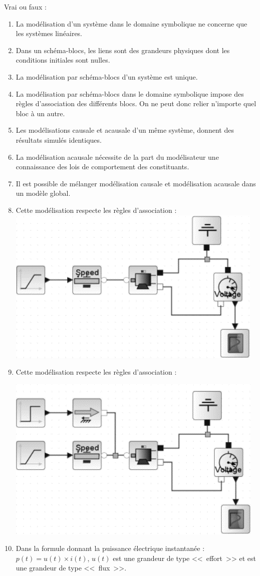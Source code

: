 \documentclass[10pt,fleqn]{article} %
\begin{document}
\def\pathfig{images}

\vspace{8cm}
\pagestyle{fancy}
\thispagestyle{plain}

\def\columnseprulecolor{\color{ocre}}
\setlength{\columnseprule}{0.4pt} 

\def\pathfig{images}

\ifprof
\else
Vrai ou faux : 
\begin{enumerate}
\item La modélisation d’un système dans le domaine symbolique ne concerne que les systèmes linéaires. 
\item Dans un schéma-blocs, les liens sont des grandeurs physiques dont les conditions initiales sont nulles. 
\item La modélisation par schéma-blocs d’un système est unique.
\item La modélisation par schéma-blocs dans le domaine symbolique impose des règles d’association des différents blocs. On ne peut donc relier n’importe quel bloc à un autre.
\item Les modélisations causale et acausale d’un même système, donnent des résultats simulés identiques.
\item La modélisation acausale nécessite de la part du modélisateur une connaissance des lois de comportement des constituants.
\item Il est possible de mélanger modélisation causale et modélisation acausale dans un modèle global.
\item Cette modélisation respecte les règles d’association : 
\includegraphics[width=.4\linewidth]{images/fig_01}
\item Cette modélisation respecte les règles d’association : 
\begin{center}
\includegraphics[width=.4\linewidth]{images/fig_02}
\end{center}

\item Dans la formule donnant la puissance électrique instantanée : $p(t)=u(t)\times i(t)$, $u(t)$ est une grandeur de type <<~effort~>> et est une grandeur de type <<~flux~>>.

\end{enumerate}
\end{document}
